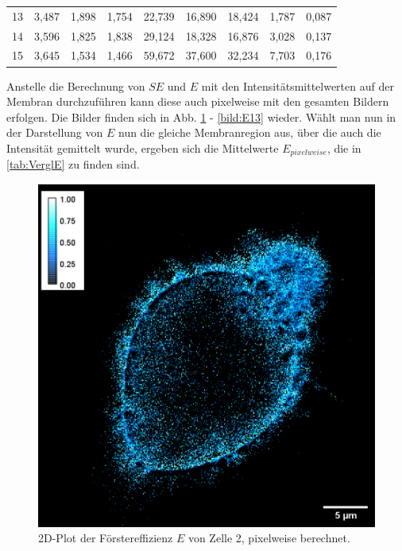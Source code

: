 \begin{center}
\begin{tabular}{lrrrrrrrr}
        13    & 3,487 & 1,898 & 1,754 &  22,739 &  16,890 & 18,424 &  1,787 & 0,087 \\
        14    & 3,596 & 1,825 & 1,838 &  29,124 &  18,328 & 16,876 &  3,028 & 0,137 \\
        15    & 3,645 & 1,534 & 1,466 &  59,672 &  37,600 & 32,234 &  7,703 & 0,176 \\
        \bottomrule
    \end{tabular}
    \label{tab:CY}
\end{center}


Anstelle die Berechnung von $SE$ und $E$ mit den Intensitätsmittelwerten auf der Membran durchzuführen kann diese auch pixelweise 
mit den gesamten Bildern erfolgen. Die Bilder finden sich in Abb. \ref{bild:E2} - \ref{bild:E13} wieder. Wählt man nun in der Darstellung 
von $E$ nun die gleiche 
Membranregion aus, über die auch die Intensität gemittelt wurde, ergeben sich die Mittelwerte $E_{pixelweise}$, die in \ref{tab:VerglE} 
zu finden sind.

\begin{figure}[h]
    \centering
    \includegraphics[scale = 0.45]{Bilder/E2.png}
    \caption{2D-Plot der Förstereffizienz $E$ von Zelle 2, pixelweise berechnet.}
    \label{bild:E2}
\end{figure}

